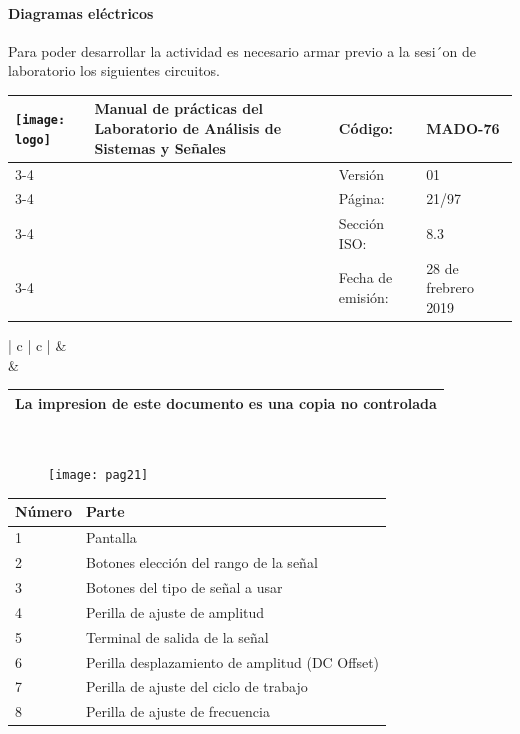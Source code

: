 \paragraph*{Diagramas eléctricos}

Para poder desarrollar la actividad es necesario armar previo a la sesi´on de laboratorio los siguientes circuitos.






\centering
\begin{tabular}{ |	p{30 mm}|	p{61 mm}	|	p{33mm}	| p{43mm}	| } 
	\hline
	\multirow{4}{30mm}{\centering \texttt{[image: logo]}} &
	\multirow{4}{61mm}{\centering \textbf{ \textbf{Manual de prácticas del Laboratorio de Análisis de Sistemas y Señales}}}    & Código: & MADO-76 \\
	\cline{3-4}
	& &  Versión & 01 \\
	\cline{3-4}
	& & Página: & 21/97 \\ \cline{3-4}
	& & Sección ISO: & 8.3 \\ \cline{3-4}
	& & Fecha de emisión: & 28 de frebrero 2019 \\
	\hline
\end{tabular}
\begin{tabular}{ |	c |	c	| } 
	 &
	   \\
	& \\ \hline
\end{tabular}
\begin{tabular}{|p{180mm}|}
	\multirow{1}{180mm}{ \centering La impresion de este documento es una copia no controlada }  \\ \hline \end{tabular} \\
\vspace{1cm}


\begin{figure}[h]
	\center
	\texttt{[image: pag21]}
\end{figure}



\begin{tabular}{|l|l|}
	\hline
	Número & Parte  \\
	\hline
	 1 & Pantalla  \\
	\hline
	2 &  Botones elección del rango de la señal \\
	\hline
	3 &  Botones del tipo de señal a usar \\
	\hline
	4 & Perilla de ajuste de amplitud  \\
	\hline
	5 & Terminal de salida de la señal \\
	\hline
	6 & Perilla desplazamiento de amplitud (DC Offset) \\
	\hline
	7 & Perilla de ajuste del ciclo de trabajo \\
	\hline
	8 &  Perilla de ajuste de frecuencia \\
	\hline
\end{tabular}

